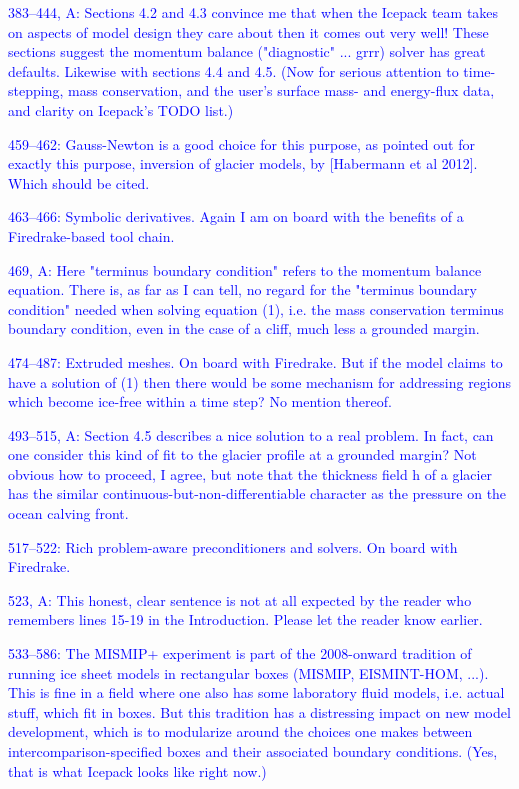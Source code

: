 \documentclass{article}
\theoremstyle{definition}
\theoremstyle{plain}
\begin{document}
\textcolor{blue}{383--444, A:  Sections 4.2 and 4.3 convince me that when the Icepack team takes on aspects of model design they care about then it comes out very well!  These sections suggest the momentum balance ("diagnostic" ... grrr) solver has great defaults.  Likewise with sections 4.4 and 4.5.  (Now for serious attention to time-stepping, mass conservation, and the user's surface mass- and energy-flux data, and clarity on Icepack's TODO list.)}

\textcolor{blue}{459--462:  Gauss-Newton is a good choice for this purpose, as pointed out for exactly this purpose, inversion of glacier models, by [Habermann et al 2012].  Which should be cited.}

\textcolor{blue}{463--466:  Symbolic derivatives.  Again I am on board with the benefits of a Firedrake-based tool chain.}

\textcolor{blue}{469, A:  Here "terminus boundary condition" refers to the momentum balance equation.  There is, as far as I can tell, no regard for the "terminus boundary condition" needed when solving equation (1), i.e. the mass conservation terminus boundary condition, even in the case of a cliff, much less a grounded margin.}

\textcolor{blue}{474--487:  Extruded meshes.  On board with Firedrake.  But if the model claims to have a solution of (1) then there would be some mechanism for addressing regions which become ice-free within a time step?  No mention thereof.}

\textcolor{blue}{493--515, A:  Section 4.5 describes a nice solution to a real problem.  In fact, can one consider this kind of fit to the glacier profile at a grounded margin?  Not obvious how to proceed, I agree, but note that the thickness field h of a glacier has the similar continuous-but-non-differentiable character as the pressure on the ocean calving front.}

\textcolor{blue}{517--522:  Rich problem-aware preconditioners and solvers.  On board with Firedrake.}

\textcolor{blue}{523, A:  This honest, clear sentence is not at all expected by the reader who remembers lines 15-19 in the Introduction.  Please let the reader know earlier.}

\textcolor{blue}{533--586:  The MISMIP+ experiment is part of the 2008-onward tradition of running ice sheet models in rectangular boxes (MISMIP, EISMINT-HOM, ...).  This is fine in a field where one also has some laboratory fluid models, i.e. actual stuff, which fit in boxes.  But this tradition has a distressing impact on new model development, which is to modularize around the choices one makes between intercomparison-specified boxes and their associated boundary conditions.  (Yes, that is what Icepack looks like right now.)}
\end{document}
